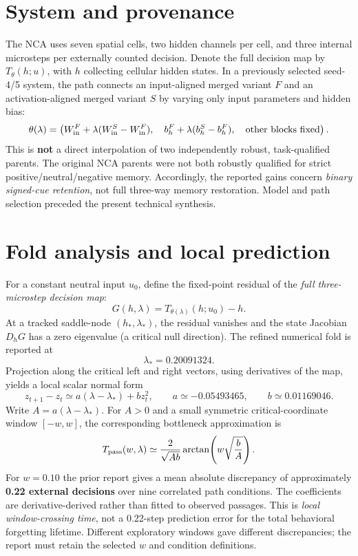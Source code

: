 \documentclass[10pt]{article}
\begin{document}
\section{System and provenance}
The NCA uses seven spatial cells, two hidden channels per cell, and three internal microsteps per externally counted decision. Denote the full decision map by $T_{\theta}(h;u)$, with $h$ collecting cellular hidden states. In a previously selected seed-4/5 system, the path connects an input-aligned merged variant $F$ and an activation-aligned merged variant $S$ by varying only input parameters and hidden bias:
\begin{equation}
\theta(\lambda)=\left(W_{\rm in}^{F}+\lambda(W_{\rm in}^{S}-W_{\rm in}^{F}),\quad b_h^{F}+\lambda(b_h^{S}-b_h^{F}),\quad\text{other blocks fixed}\right).
\end{equation}
This is \textbf{not} a direct interpolation of two independently robust, task-qualified parents. The original NCA parents were not both robustly qualified for strict positive/neutral/negative memory. Accordingly, the reported gains concern \emph{binary signed-cue retention}, not full three-way memory restoration. Model and path selection preceded the present technical synthesis.

\section{Fold analysis and local prediction}
For a constant neutral input $u_0$, define the fixed-point residual of the \emph{full three-microstep decision map}:
\begin{equation}
G(h,\lambda)=T_{\theta(\lambda)}(h;u_0)-h.
\end{equation}
At a tracked saddle-node $(h_*,\lambda_*)$, the residual vanishes and the state Jacobian $D_hG$ has a zero eigenvalue (a critical null direction). The refined numerical fold is reported at
\begin{equation}
\lambda_*=0.20091324.
\end{equation}
Projection along the critical left and right vectors, using derivatives of the map, yields a local scalar normal form
\begin{equation}
 z_{t+1}-z_t\simeq a(\lambda-\lambda_*)+b z_t^2,
 \qquad a\simeq -0.05493465,\qquad b\simeq 0.01169046.
\end{equation}
Write $A=a(\lambda-\lambda_*)$. For $A>0$ and a small symmetric critical-coordinate window $[-w,w]$, the corresponding bottleneck approximation is
\begin{equation}
 T_{\rm pass}(w,\lambda)\simeq\frac{2}{\sqrt{Ab}}\arctan\!\left(w\sqrt{\frac{b}{A}}\right).
\end{equation}
For $w=0.10$ the prior report gives a mean absolute discrepancy of approximately \textbf{0.22 external decisions} over nine correlated path conditions. The coefficients are derivative-derived rather than fitted to observed passages. This is \emph{local window-crossing time}, not a 0.22-step prediction error for the total behavioral forgetting lifetime. Different exploratory windows gave different discrepancies; the report must retain the selected $w$ and condition definitions.
\end{document}
